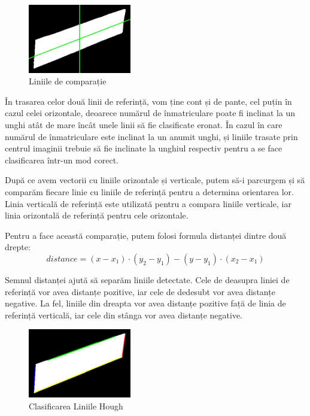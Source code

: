 \documentclass[a4paper,12pt]{report}
\begin{document}
\begin{figure}[h!]
    \centering
    \includegraphics[width=0.4\textwidth]{images/reference_lines.jpg}
    \caption{Liniile de comparație}
\end{figure}
\FloatBarrier

În trasarea celor două linii de referință, vom ține cont și de pante, cel puțin în cazul celei orizontale, deoarece numărul de înmatriculare poate fi inclinat la un unghi atât de mare încât unele linii să fie clasificate eronat. În cazul în care numărul de înmatriculare este inclinat la un anumit unghi, și liniile trasate prin centrul imaginii trebuie să fie inclinate la unghiul respectiv pentru a se face clasificarea într-un mod corect.

După ce avem vectorii cu liniile orizontale și verticale, putem să-i parcurgem și să comparăm fiecare linie cu liniile de referință pentru a determina orientarea lor. Linia verticală de referință este utilizată pentru a compara liniile verticale, iar linia orizontală de referință pentru cele orizontale.

Pentru a face această comparație, putem folosi formula distanței dintre două drepte:
\[
    distance = (x - x_1) \cdot (y_2 - y_1) - (y - y_1) \cdot (x_2 - x_1)
\]

Semnul distanței ajută să separăm liniile detectate. Cele de deasupra liniei de referință vor avea distanțe pozitive, iar cele de dedesubt vor avea distanțe negative. La fel, liniile din dreapta vor avea distanțe pozitive față de linia de referință verticală, iar cele din stânga vor avea distanțe negative.

\begin{figure}[h!]
    \centering
    \includegraphics[width=0.4\textwidth]{images/multiple_lines.jpg}
    \caption{Clasificarea Liniile Hough}
\end{figure}
\FloatBarrier
\end{document}
